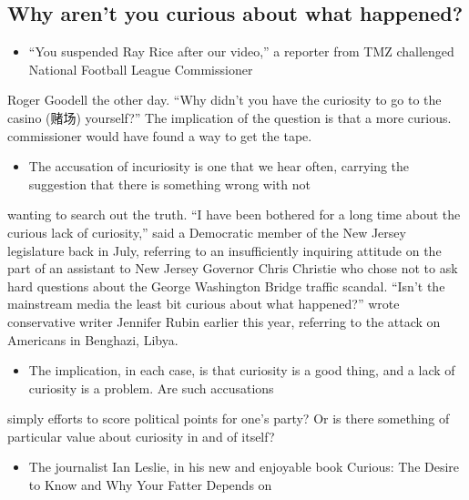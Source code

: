 \documentclass[UTF8,11pt]{ctexart}
\begin{document}
\subsection*{\textbf{Why aren't you curious about what happened?}}


\begin{itemize}[leftmargin=2em,itemsep=.2em,topsep=.4em]\item[A.] “You suspended Ray Rice after our video,” a reporter from TMZ challenged National Football League Commissioner
\end{itemize}

Roger Goodell the other day. “Why didn’t you have the curiosity to go to the casino (赌场) yourself?” The implication of the question is that a more curious. commissioner would have found a way to get the tape.


\begin{itemize}[leftmargin=2em,itemsep=.2em,topsep=.4em]\item[B.] The accusation of incuriosity is one that we hear often, carrying the suggestion that there is something wrong with not
\end{itemize}

wanting to search out the truth. “I have been bothered for a long time about the curious lack of curiosity,” said a Democratic member of the New Jersey legislature back in July, referring to an insufficiently inquiring attitude on the part of an assistant to New Jersey Governor Chris Christie who chose not to ask hard questions about the George Washington Bridge traffic scandal. “Isn’t the mainstream media the least bit curious about what happened?” wrote conservative writer Jennifer Rubin earlier this year, referring to the attack on Americans in Benghazi, Libya.


\begin{itemize}[leftmargin=2em,itemsep=.2em,topsep=.4em]\item[C.] The implication, in each case, is that curiosity is a good thing, and a lack of curiosity is a problem. Are such accusations
\end{itemize}

simply efforts to score political points for one's party? Or is there something of particular value about curiosity in and of itself?


\begin{itemize}[leftmargin=2em,itemsep=.2em,topsep=.4em]\item[D.] The journalist Ian Leslie, in his new and enjoyable book Curious: The Desire to Know and Why Your Fatter Depends on
\end{itemize}
\end{document}
